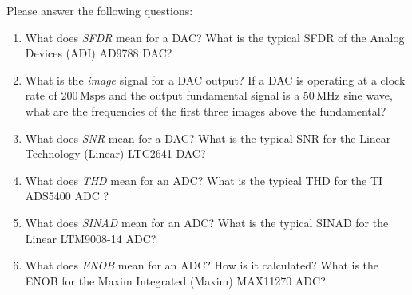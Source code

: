 \documentclass[letterpaper, 11pt]{article}
\begin{document}
\reversemarginpar
{}  Please answer the following questions:
\begin{enumerate}[itemsep=0.1ex, label=\alph*)]
	
	\item What does \textit{SFDR} mean for a DAC? What is the typical SFDR of the Analog Devices (ADI) AD9788 DAC? 

	\item What is the \textit{image} signal for a DAC output? If a DAC is operating at a clock rate of 200\,Msps and the output fundamental signal is a 50\,MHz sine wave, what are the frequencies of the first three images above the fundamental? 
	
	\item What does \textit{SNR} mean for a DAC? What is the typical SNR for the Linear Technology (Linear) LTC2641 DAC?
	
	\item What does \textit{THD} mean for an ADC? What is the typical THD for the TI ADS5400 ADC ?
	
	\item What does \textit{SINAD} mean for an ADC? What is the typical SINAD for the Linear LTM9008-14 ADC? 
	
	\item What does \textit{ENOB} mean for an ADC? How is it calculated? What is the ENOB for the Maxim Integrated (Maxim) MAX11270 ADC?
	
\end{enumerate}
\end{document}
